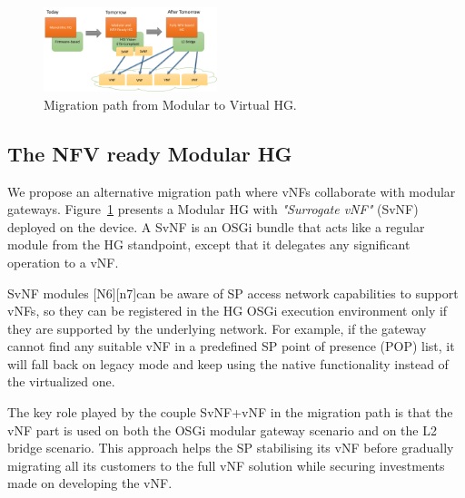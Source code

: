 \begin{figure}
  \begin{center}
    \includegraphics[width=0.45\textwidth,natwidth=6955,natheight=3398]{fig/vhgMigrationPath.png}
  \end{center}
  \caption{ Migration path from Modular to Virtual HG.
    \label{fig:migration}
  }
\end{figure}


\subsection{The NFV ready Modular HG}
We propose an alternative migration path where vNFs collaborate with modular gateways.
Figure~\ref{fig:migration} presents a Modular HG with \textit{"Surrogate vNF"} (SvNF) deployed on the device.
A SvNF is an OSGi bundle that acts like a regular module from the HG standpoint, except that it delegates any significant operation to a vNF.

SvNF modules [N6][n7]can be aware of SP access network capabilities to support vNFs, so they can be registered in the HG OSGi execution environment only if they are supported by the underlying network.
For example, if the gateway cannot find any suitable vNF in a predefined SP point of presence (POP) list, it will fall back on legacy mode and keep using the native functionality instead of the virtualized one.

The key role played by the couple SvNF+vNF in the migration path is that the vNF part is used on both the OSGi modular gateway scenario and on the L2 bridge scenario.
This approach helps the SP stabilising its vNF before gradually migrating all its customers to the full vNF solution while securing investments made on developing the vNF.
 
